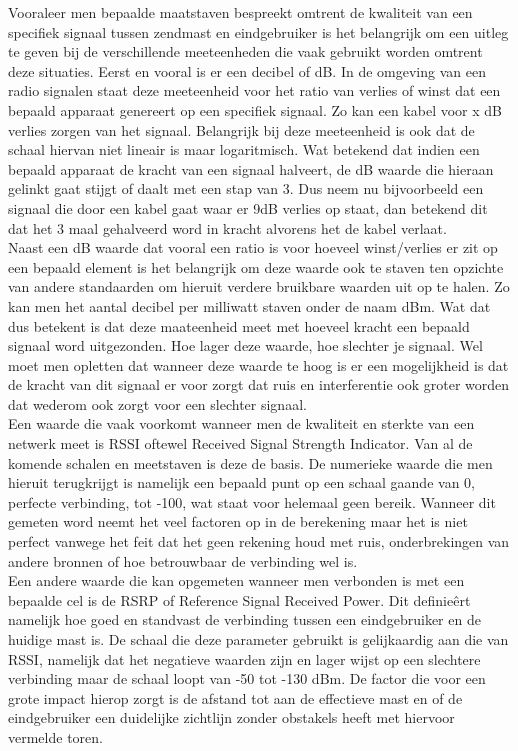 Vooraleer men bepaalde maatstaven bespreekt omtrent de kwaliteit van een specifiek signaal tussen zendmast en eindgebruiker is het belangrijk om een uitleg te geven bij de verschillende meeteenheden die vaak gebruikt worden omtrent deze situaties. Eerst en vooral is er een decibel of dB. In de omgeving van een radio signalen staat deze meeteenheid voor het ratio van verlies of winst dat een bepaald apparaat genereert op een specifiek signaal. Zo kan een kabel voor x dB verlies zorgen van het signaal. Belangrijk bij deze meeteenheid is ook dat de schaal hiervan niet lineair is maar logaritmisch. Wat betekend dat indien een bepaald apparaat de kracht van een signaal halveert, de dB waarde die hieraan gelinkt gaat stijgt of daalt met een stap van 3. Dus neem nu bijvoorbeeld een signaal die door een kabel gaat waar er 9dB verlies op staat, dan betekend dit dat het 3 maal gehalveerd word in kracht alvorens het de kabel verlaat. \autocite{Young2004} \\

Naast een dB waarde dat vooral een ratio is voor hoeveel winst/verlies er zit op een bepaald element is het belangrijk om deze waarde ook te staven ten opzichte van andere standaarden om hieruit verdere bruikbare waarden uit op te halen. Zo kan men het aantal decibel per milliwatt staven onder de naam dBm. Wat dat dus betekent is dat deze maateenheid meet met hoeveel kracht een bepaald signaal word uitgezonden. Hoe lager deze waarde, hoe slechter je signaal. Wel moet men opletten dat wanneer deze waarde te hoog is er een mogelijkheid is dat de kracht van dit signaal er voor zorgt dat ruis en interferentie ook groter worden dat wederom ook zorgt voor een slechter signaal. \autocite{Hardesty2023} \\

Een waarde die vaak voorkomt wanneer men de kwaliteit en sterkte van een netwerk meet is RSSI oftewel Received Signal Strength Indicator. Van al de komende schalen en meetstaven is deze de basis. De numerieke waarde die men hieruit terugkrijgt is namelijk een bepaald punt op een schaal gaande van 0, perfecte verbinding, tot -100, wat staat voor helemaal geen bereik. Wanneer dit gemeten word neemt het veel factoren op in de berekening maar het is niet perfect vanwege het feit dat het geen rekening houd met ruis, onderbrekingen van andere bronnen of hoe betrouwbaar de verbinding wel is.  \autocite{Ramirez2023} \\

Een andere waarde die kan opgemeten wanneer men verbonden is met een bepaalde cel is de RSRP of Reference Signal Received Power. Dit definieêrt namelijk hoe goed en standvast de verbinding tussen een eindgebruiker en de huidige mast is. De schaal die deze parameter gebruikt is gelijkaardig aan die van RSSI, namelijk dat het negatieve waarden zijn en lager wijst op een slechtere verbinding maar de schaal loopt van -50 tot -130 dBm. De factor die voor een grote impact hierop zorgt is de afstand tot aan de effectieve mast en of de eindgebruiker een duidelijke zichtlijn zonder obstakels heeft met hiervoor vermelde toren. \autocite{Ramirez2023} \\

